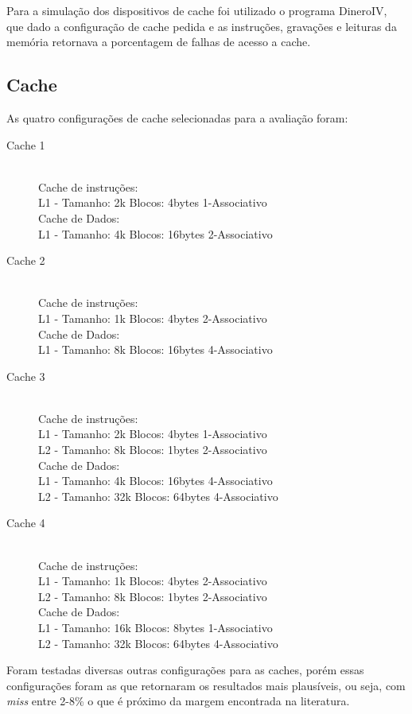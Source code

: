 \documentclass[pdftex,12pt,a4paper]{article}
\begin{document}
Para a simulação dos dispositivos de cache foi utilizado o programa DineroIV, 
que dado a configuração de cache pedida e as instruções, gravações e leituras 
da memória retornava a porcentagem de falhas de acesso a cache.

\subsection{Cache}

As quatro configurações de cache selecionadas para a avaliação foram:

\begin{description}
\item[Cache 1] \hfill \\
Cache de instruções:\\
L1 - Tamanho: 2k Blocos: 4bytes 1-Associativo\\
Cache de Dados:\\
L1 - Tamanho: 4k Blocos: 16bytes 2-Associativo
\item[Cache 2] \hfill \\
Cache de instruções:\\
L1 - Tamanho: 1k Blocos: 4bytes 2-Associativo\\
Cache de Dados:\\
L1 - Tamanho: 8k Blocos: 16bytes 4-Associativo
\item[Cache 3] \hfill \\
Cache de instruções:\\
L1 - Tamanho: 2k Blocos: 4bytes 1-Associativo\\
L2 - Tamanho: 8k Blocos: 1bytes 2-Associativo\\
Cache de Dados:\\
L1 - Tamanho: 4k Blocos: 16bytes 4-Associativo\\
L2 - Tamanho: 32k Blocos: 64bytes 4-Associativo
\item[Cache 4] \hfill \\
Cache de instruções:\\
L1 - Tamanho: 1k Blocos: 4bytes 2-Associativo\\
L2 - Tamanho: 8k Blocos: 1bytes 2-Associativo\\
Cache de Dados:\\
L1 - Tamanho: 16k Blocos: 8bytes 1-Associativo\\
L2 - Tamanho: 32k Blocos: 64bytes 4-Associativo
\end{description}

Foram testadas diversas outras configurações para as caches, porém essas configurações foram as que 
retornaram os resultados mais plausíveis, ou seja, com \textit{miss} entre 2-8\% o que é próximo da margem 
encontrada na literatura.
\end{document}

